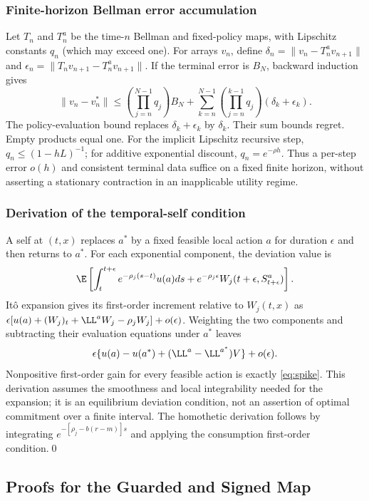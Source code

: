 \subsubsection{Finite-horizon Bellman error accumulation}
Let $T_n$ and $T_n^a$ be the time-$n$ Bellman and fixed-policy maps, with Lipschitz constants $q_n$ (which may exceed one). For arrays $v_n$, define $\delta_n=\|v_n-T_n^av_{n+1}\|$ and $\epsilon_n=\|T_nv_{n+1}-T_n^av_{n+1}\|$. If the terminal error is $B_N$, backward induction gives
\[
 \|v_n-v_n^*\|\leq\left(\prod_{j=n}^{N-1}q_j\right)B_N
 +\sum_{k=n}^{N-1}\left(\prod_{j=n}^{k-1}q_j\right)(\delta_k+\epsilon_k).
\]
The policy-evaluation bound replaces $\delta_k+\epsilon_k$ by $\delta_k$. Their sum bounds regret. Empty products equal one. For the implicit Lipschitz recursive step, $q_n\leq(1-hL)^{-1}$; for additive exponential discount, $q_n=e^{-\rho h}$. Thus a per-step error $o(h)$ and consistent terminal data suffice on a fixed finite horizon, without asserting a stationary contraction in an inapplicable utility regime.

\subsubsection{Derivation of the temporal-self condition}
A self at $(t,x)$ replaces $a^*$ by a fixed feasible local action $a$ for duration $\epsilon$ and then returns to $a^*$. For each exponential component, the deviation value is
\[
 \E\left[\int_t^{t+\epsilon}e^{-\rho_j(s-t)}u(a)ds
     +e^{-\rho_j\epsilon}W_j(t+\epsilon,S_{t+\epsilon}^{a})\right].
\]
It\^o expansion gives its first-order increment relative to $W_j(t,x)$ as $\epsilon[u(a)+(W_j)_t+\LL^aW_j-\rho_jW_j]+o(\epsilon)$. Weighting the two components and subtracting their evaluation equations under $a^*$ leaves
\[
 \epsilon\{u(a)-u(a^*)+(\LL^a-\LL^{a^*})V\}+o(\epsilon).
\]
Nonpositive first-order gain for every feasible action is exactly \eqref{eq:spike}. This derivation assumes the smoothness and local integrability needed for the expansion; it is an equilibrium deviation condition, not an assertion of optimal commitment over a finite interval. The homothetic derivation follows by integrating $e^{-[\rho_j-b(r-m)]s}$ and applying the consumption first-order condition.\qed

\subsection{Proofs for the Guarded and Signed Map}\label{app:r9proofs}
